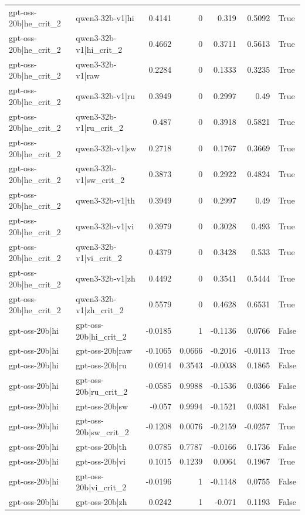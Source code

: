 \begin{table}
\begin{tabular}{l l r r r r l}
gpt-oss-20b|he_crit_2 & qwen3-32b-v1|hi & 0.4141 & 0 & 0.319 & 0.5092 & True \\
gpt-oss-20b|he_crit_2 & qwen3-32b-v1|hi_crit_2 & 0.4662 & 0 & 0.3711 & 0.5613 & True \\
gpt-oss-20b|he_crit_2 & qwen3-32b-v1|raw & 0.2284 & 0 & 0.1333 & 0.3235 & True \\
gpt-oss-20b|he_crit_2 & qwen3-32b-v1|ru & 0.3949 & 0 & 0.2997 & 0.49 & True \\
gpt-oss-20b|he_crit_2 & qwen3-32b-v1|ru_crit_2 & 0.487 & 0 & 0.3918 & 0.5821 & True \\
gpt-oss-20b|he_crit_2 & qwen3-32b-v1|sw & 0.2718 & 0 & 0.1767 & 0.3669 & True \\
gpt-oss-20b|he_crit_2 & qwen3-32b-v1|sw_crit_2 & 0.3873 & 0 & 0.2922 & 0.4824 & True \\
gpt-oss-20b|he_crit_2 & qwen3-32b-v1|th & 0.3949 & 0 & 0.2997 & 0.49 & True \\
gpt-oss-20b|he_crit_2 & qwen3-32b-v1|vi & 0.3979 & 0 & 0.3028 & 0.493 & True \\
gpt-oss-20b|he_crit_2 & qwen3-32b-v1|vi_crit_2 & 0.4379 & 0 & 0.3428 & 0.533 & True \\
gpt-oss-20b|he_crit_2 & qwen3-32b-v1|zh & 0.4492 & 0 & 0.3541 & 0.5444 & True \\
gpt-oss-20b|he_crit_2 & qwen3-32b-v1|zh_crit_2 & 0.5579 & 0 & 0.4628 & 0.6531 & True \\
gpt-oss-20b|hi & gpt-oss-20b|hi_crit_2 & -0.0185 & 1 & -0.1136 & 0.0766 & False \\
gpt-oss-20b|hi & gpt-oss-20b|raw & -0.1065 & 0.0666 & -0.2016 & -0.0113 & True \\
gpt-oss-20b|hi & gpt-oss-20b|ru & 0.0914 & 0.3543 & -0.0038 & 0.1865 & False \\
gpt-oss-20b|hi & gpt-oss-20b|ru_crit_2 & -0.0585 & 0.9988 & -0.1536 & 0.0366 & False \\
gpt-oss-20b|hi & gpt-oss-20b|sw & -0.057 & 0.9994 & -0.1521 & 0.0381 & False \\
gpt-oss-20b|hi & gpt-oss-20b|sw_crit_2 & -0.1208 & 0.0076 & -0.2159 & -0.0257 & True \\
gpt-oss-20b|hi & gpt-oss-20b|th & 0.0785 & 0.7787 & -0.0166 & 0.1736 & False \\
gpt-oss-20b|hi & gpt-oss-20b|vi & 0.1015 & 0.1239 & 0.0064 & 0.1967 & True \\
gpt-oss-20b|hi & gpt-oss-20b|vi_crit_2 & -0.0196 & 1 & -0.1148 & 0.0755 & False \\
gpt-oss-20b|hi & gpt-oss-20b|zh & 0.0242 & 1 & -0.071 & 0.1193 & False \\

\end{tabular}
\end{table}
